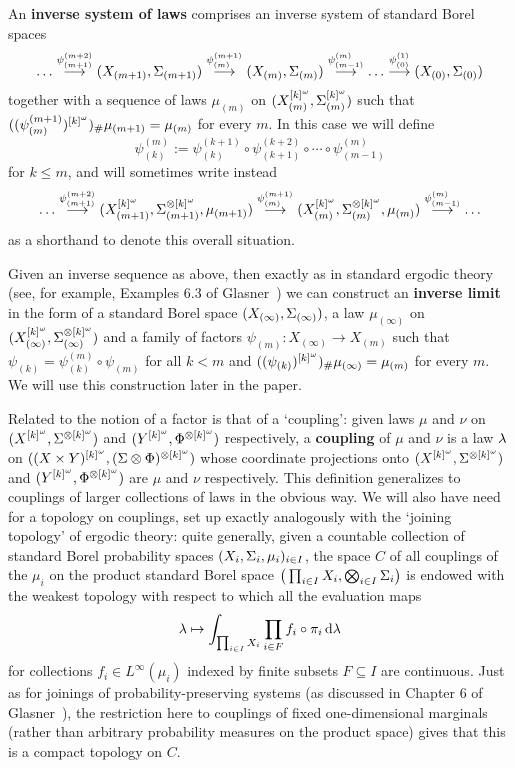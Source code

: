 \documentclass[11pt]{article}
\begin{document}
An \textbf{inverse system of laws} comprises an inverse system of
standard Borel spaces
\[\ldots \stackrel{\psi^{(m+2)}_{(m+1)}}{\longrightarrow}(X_{(m+1)},\S_{(m+1)})\stackrel{\psi^{(m+1)}_{(m)}}{\longrightarrow}(X_{(m)},\S_{(m)})\stackrel{\psi^{(m)}_{(m-1)}}{\longrightarrow}\ldots\stackrel{\psi^{(1)}_{(0)}}{\longrightarrow}(X_{(0)},\S_{(0)})\]
together with a sequence of laws $\mu_{(m)}$ on
$(X_{(m)}^{[k]^\o},\S_{(m)}^{[k]^\o})$ such that
$((\psi^{(m+1)}_{(m)})^{[k]^\o})_\#\mu_{(m+1)} = \mu_{(m)}$ for
every $m$. In this case we will define
\[\psi^{(m)}_{(k)}:= \psi^{(k+1)}_{(k)}\circ\psi^{(k+2)}_{(k+1)}\circ\cdots\circ\psi^{(m)}_{(m-1)}\]
for $k\leq m$, and will sometimes write instead
\[\ldots \stackrel{\psi^{(m+2)}_{(m+1)}}{\longrightarrow}(X^{[k]^\o}_{(m+1)},\S^{\otimes[k]^\o}_{(m+1)},\mu_{(m+1)})\stackrel{\psi^{(m+1)}_{(m)}}{\longrightarrow}(X^{[k]^\o}_{(m)},\S^{\otimes [k]^\o}_{(m)},\mu_{(m)})\stackrel{\psi^{(m)}_{(m-1)}}{\longrightarrow}\ldots\]
as a shorthand to denote this overall situation.

Given an inverse sequence as above, then exactly as in standard
ergodic theory (see, for example, Examples 6.3 of
Glasner~\cite{Gla03}) we can construct an \textbf{inverse limit} in
the form of a standard Borel space $(X_{(\infty)},\S_{(\infty)})$, a
law $\mu_{(\infty)}$ on
$(X^{[k]^\o}_{(\infty)},\S^{\otimes[k]^\o}_{(\infty)})$ and a family
of factors $\psi_{(m)}:X_{(\infty)}\to X_{(m)}$ such that
$\psi_{(k)} = \psi^{(m)}_{(k)}\circ\psi_{(m)}$ for all $k < m$ and
$((\psi_{(k)})^{[k]^\o})_\#\mu_{(\infty)} = \mu_{(m)}$ for every
$m$.  We will use this construction later in the paper.

Related to the notion of a factor is that of a `coupling': given
laws $\mu$ and $\nu$ on $(X^{[k]^\o},\S^{\otimes[k]^\o})$ and
$(Y^{[k]^\o},\Phi^{\otimes[k]^\o})$ respectively, a
\textbf{coupling} of $\mu$ and $\nu$ is a law $\l$ on $((X\times
Y)^{[k]^\o},(\S\otimes \Phi)^{\otimes[k]^\o})$ whose coordinate
projections onto $(X^{[k]^\o},\S^{\otimes[k]^\o})$ and
$(Y^{[k]^\o},\Phi^{\otimes[k]^\o})$ are $\mu$ and $\nu$
respectively.  This definition generalizes to couplings of larger
collections of laws in the obvious way.  We will also have need for
a topology on couplings, set up exactly analogously with the
`joining topology' of ergodic theory: quite generally, given a
countable collection of standard Borel probability spaces
$(X_i,\S_i,\mu_i)_{i\in I}$, the space $C$ of all couplings of the
$\mu_i$ on the product standard Borel space $\big(\prod_{i\in
I}X_i,\bigotimes_{i\in I}\S_i\big)$ is endowed with the weakest
topology with respect to which all the evaluation maps
\[\l \mapsto \int_{\prod_{i\in I}X_i}\prod_{i \in F}f_i\circ\pi_i\,\d\l\]
for collections $f_i \in L^\infty(\mu_i)$ indexed by finite subsets
$F \subseteq I$ are continuous.  Just as for joinings of
probability-preserving systems (as discussed in Chapter 6 of
Glasner~\cite{Gla03}), the restriction here to couplings of fixed
one-dimensional marginals (rather than arbitrary probability
measures on the product space) gives that this is a compact topology
on $C$.
\end{document}
